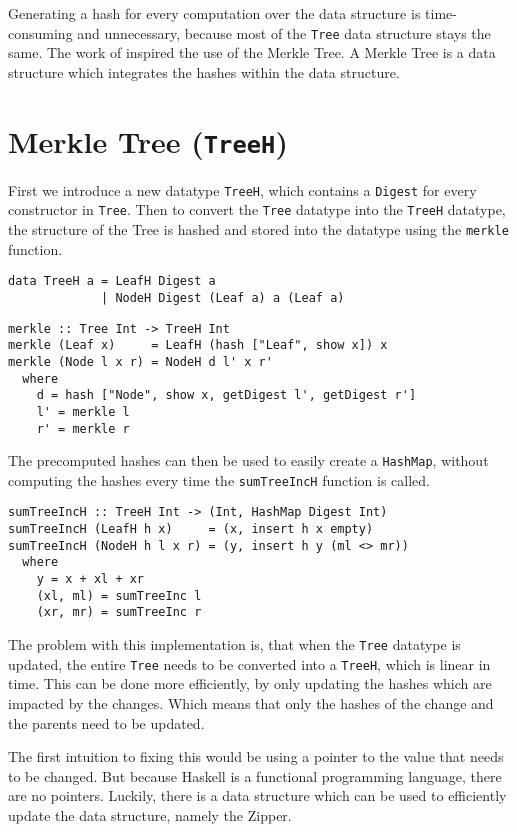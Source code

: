 Generating a hash for every computation over the data structure is time-consuming and unnecessary, because most of the \texttt{Tree} data structure stays the same. The work of \citeauthor{miraldo2019efficient}\cite{miraldo2019efficient} inspired the use of the Merkle Tree. A Merkle Tree is a data structure which integrates the hashes within the data structure.

\section{Merkle Tree (\texttt{TreeH})}
First we introduce a new datatype \texttt{TreeH}, which contains a \texttt{Digest} for every constructor in \texttt{Tree}. Then to convert the \texttt{Tree} datatype into the \texttt{TreeH} datatype, the structure of the Tree is hashed and stored into the datatype using the \texttt{merkle} function.

\begin{verbatim}
data TreeH a = LeafH Digest a
             | NodeH Digest (Leaf a) a (Leaf a)
\end{verbatim}

\begin{verbatim}
merkle :: Tree Int -> TreeH Int
merkle (Leaf x)     = LeafH (hash ["Leaf", show x]) x
merkle (Node l x r) = NodeH d l' x r'
  where
    d = hash ["Node", show x, getDigest l', getDigest r']
    l' = merkle l
    r' = merkle r
\end{verbatim}

The precomputed hashes can then be used to easily create a \texttt{HashMap}, without computing the hashes every time the \texttt{sumTreeIncH} function is called.

\begin{verbatim}
sumTreeIncH :: TreeH Int -> (Int, HashMap Digest Int)
sumTreeIncH (LeafH h x)     = (x, insert h x empty)
sumTreeIncH (NodeH h l x r) = (y, insert h y (ml <> mr))
  where
    y = x + xl + xr
    (xl, ml) = sumTreeInc l
    (xr, mr) = sumTreeInc r
\end{verbatim}

The problem with this implementation is, that when the \texttt{Tree} datatype is updated, the entire \texttt{Tree} needs to be converted into a \texttt{TreeH}, which is linear in time. This can be done more efficiently, by only updating the hashes which are impacted by the changes. Which means that only the hashes of the change and the parents need to be updated. 

The first intuition to fixing this would be using a pointer to the value that needs to be changed. But because Haskell is a functional programming language, there are no pointers. Luckily, there is a data structure which can be used to efficiently update the data structure, namely the Zipper\cite{huet1997zipper}.

